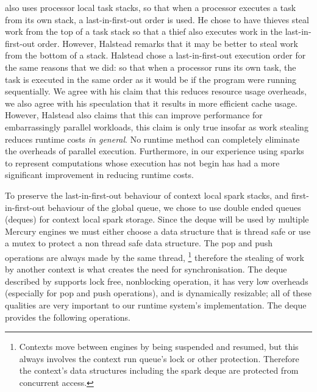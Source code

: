 \citet{halstead:1985:multilisp} also uses processor local task stacks,
so that when a processor executes a task from its own stack,
a last-in-first-out order is used.
He chose to have thieves steal work from the top of a task stack so
that a thief also executes work in the last-in-first-out order.
However, Halstead remarks that it may be better to steal work from the
bottom of a stack.
Halstead chose a last-in-first-out execution order for the same reasons
that we did:
so that when a processor runs its own task,
the task is executed in the same order as it would be if the program were
running sequentially.
We agree with his claim that this reduces resource usage overheads,
we also agree with his speculation that it results in more efficient cache
usage.
However, 
Halstead also claims that this can improve performance for
embarrassingly parallel workloads,
this claim is only true insofar as work stealing reduces runtime costs
\emph{in general}.
No runtime method can completely eliminate the overheads of parallel
execution.
Furthermore,
in our experience using sparks to represent computations whose execution has
not begin has had a more significant improvement in reducing runtime costs.

To preserve the last-in-first-out behaviour of context local spark
stacks,
and first-in-first-out behaviour of the global queue,
we chose to use double ended queues (deques) for context local spark
storage.
Since the deque will be used by multiple Mercury engines we must either
choose a data structure that is thread safe or use a mutex to protect a non
thread safe data structure.
The pop and push operations are always made by the same thread,%
\footnote{
    Contexts move between engines by being suspended and resumed,
    but this always involves the context run queue's lock or other
    protection.
    Therefore the context's data structures including the
    spark deque are protected from concurrent access.}
therefore the stealing of work by another context is what creates the need
for synchronisation.
The deque described by \citet{Chase_2005_wsdeque} supports lock free,
nonblocking
operation, it has very low overheads (especially for pop and push operations),
and is dynamically resizable;
all of these qualities are very important to our runtime system's
implementation.
The deque provides the following operations.

